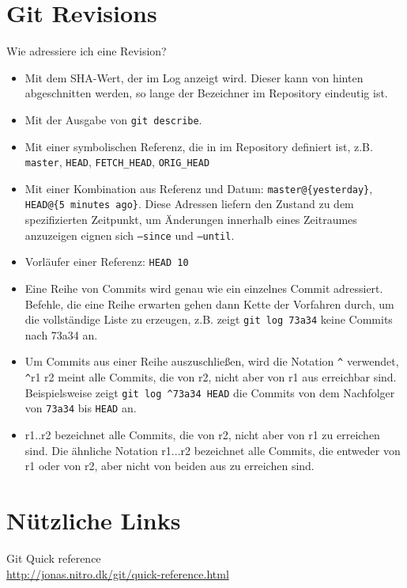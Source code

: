 \documentclass[a4paper, 12pt]{article}
\begin{document}
\newpage
\vfill

\section*{Git Revisions}

Wie adressiere ich eine Revision?

\begin{itemize}
\item Mit dem SHA-Wert, der im Log anzeigt wird. Dieser kann von hinten abgeschnitten werden, so lange der Bezeichner im Repository eindeutig ist.
\item Mit der Ausgabe von \texttt{git describe}.
\item Mit einer symbolischen Referenz, die in im Repository definiert ist, z.B. \texttt{master}, \texttt{HEAD}, \texttt{FETCH\_HEAD}, \texttt{ORIG\_HEAD}
\item Mit einer Kombination aus Referenz und Datum: \texttt{master@\{yesterday\}}, \texttt{HEAD@\{5 minutes ago\}}. Diese Adressen liefern den Zustand zu dem spezifizierten Zeitpunkt, um Änderungen innerhalb eines Zeitraumes anzuzeigen eignen sich \texttt{--since} und \texttt{--until}.
\item Vorläufer einer Referenz: \texttt{HEAD~10}
\item Eine Reihe von Commits wird genau wie ein einzelnes Commit adressiert. Befehle, die eine Reihe erwarten gehen dann Kette der Vorfahren durch, um die vollständige Liste zu erzeugen, z.B. zeigt \texttt{git log 73a34} keine Commits nach 73a34 an.
\item Um Commits aus einer Reihe auszuschließen, wird die Notation \verb|^| verwendet, \verb|^|r1 r2 meint alle Commits, die von r2, nicht aber von r1 aus erreichbar sind. Beispielsweise zeigt \texttt{git log }\verb|^|\texttt{73a34 HEAD} die Commits von dem Nachfolger von \texttt{73a34} bis \texttt{HEAD} an.
\item r1..r2 bezeichnet alle Commits, die von r2, nicht aber von r1 zu erreichen sind. Die ähnliche Notation r1...r2 bezeichnet alle Commits, die entweder von r1 oder von r2, aber nicht von beiden aus zu erreichen sind.
\end{itemize}

\vfill
\section*{Nützliche Links}

Git Quick reference\\
\url{http://jonas.nitro.dk/git/quick-reference.html}
\end{document}
